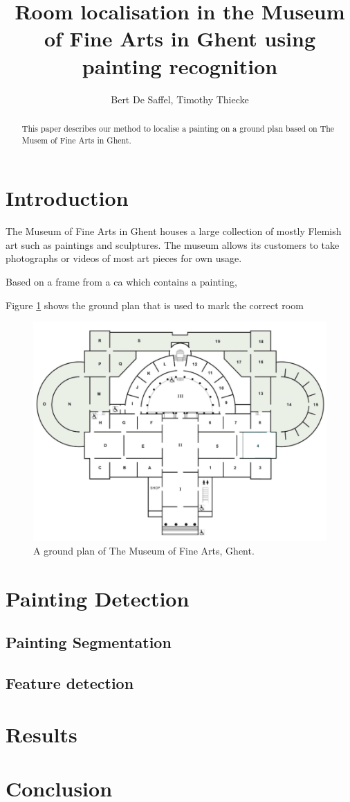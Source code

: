 \documentclass[10pt,final,journal]{IEEEtran}
\title{Room localisation in the Museum of Fine Arts in Ghent using painting recognition}
\author{Bert De Saffel, Timothy Thiecke}
\begin{document}
	\maketitle
	\begin{abstract}
		This paper describes our method to localise a painting on a ground plan based on The Musem of Fine Arts in Ghent. 
	\end{abstract}


	\section{Introduction}
	The Museum of Fine Arts in Ghent houses a large collection of mostly Flemish art such as paintings and sculptures. The museum allows its customers to take photographs or videos of most art pieces for own usage. 
	
	Based on a frame from a ca which contains a painting, 
	
	Figure \ref{fig:groundplan_msk} shows the ground plan that is used to mark the correct room
	
	\begin{figure}
		\includegraphics[width=\linewidth]{groundplan_msk}
		\caption{A ground plan of The Museum of Fine Arts, Ghent. }
		\label{fig:groundplan_msk}
	\end{figure}

	
	
	\section{Painting Detection}
	
	\lipsum[6]
	
	\subsection{Painting Segmentation}
	\lipsum[7-11]
	\subsection{Feature detection}
	\lipsum[12-15]
	\section{Results}
	\lipsum[16-18]
	\section{Conclusion}
	\lipsum[19]

	
	
\end{document}
